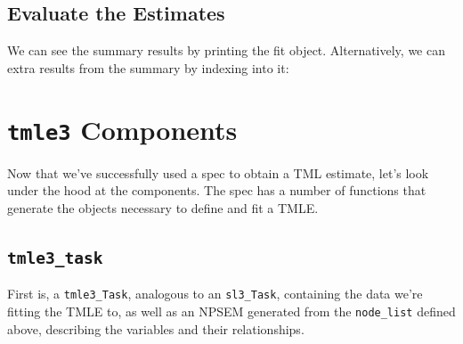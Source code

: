 \documentclass[12pt, krantz2,]{book}
\newenvironment{Shaded}{\begin{snugshade}}{\end{snugshade}}
\newcommand{\CommentTok}[1]{\textcolor[rgb]{0.56,0.35,0.01}{\textit{#1}}}
\newcommand{\KeywordTok}[1]{\textcolor[rgb]{0.13,0.29,0.53}{\textbf{#1}}}
\newcommand{\NormalTok}[1]{#1}
\newcommand{\OperatorTok}[1]{\textcolor[rgb]{0.81,0.36,0.00}{\textbf{#1}}}
\newcommand{\StringTok}[1]{\textcolor[rgb]{0.31,0.60,0.02}{#1}}
\theoremstyle{definition}
\theoremstyle{definition}
\theoremstyle{definition}
\newcommand{\1}{\mathbbm{1}}
\begin{document}
\hypertarget{evaluate-the-estimates}{%
\subsection{Evaluate the Estimates}\label{evaluate-the-estimates}}

We can see the summary results by printing the fit object. Alternatively, we
can extra results from the summary by indexing into it:

\begin{Shaded}
\end{Shaded}

\hypertarget{tmle3-components}{%
\section{\texorpdfstring{\texttt{tmle3} Components}{tmle3 Components}}\label{tmle3-components}}

Now that we've successfully used a spec to obtain a TML estimate, let's look
under the hood at the components. The spec has a number of functions that
generate the objects necessary to define and fit a TMLE.

\hypertarget{tmle3_task}{%
\subsection{\texorpdfstring{\texttt{tmle3\_task}}{tmle3\_task}}\label{tmle3_task}}

First is, a \texttt{tmle3\_Task}, analogous to an \texttt{sl3\_Task}, containing the data we're
fitting the TMLE to, as well as an NPSEM generated from the \texttt{node\_list}
defined above, describing the variables and their relationships.

\begin{Shaded}
\end{Shaded}
\end{document}
